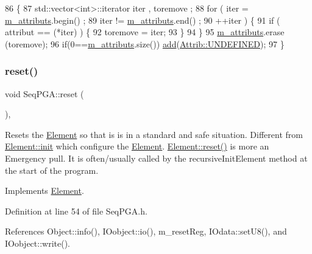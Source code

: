 \begin{DoxyCode}
86                                \{
87     std::vector<int>::iterator iter , toremove ;
88     \textcolor{keywordflow}{for} ( iter  = \hyperlink{classAttrib_ac4bd58a0cc6b38a3b711d609a3d3aacc}{m\_attributs}.begin() ;
89           iter != \hyperlink{classAttrib_ac4bd58a0cc6b38a3b711d609a3d3aacc}{m\_attributs}.end()   ;
90           ++iter ) \{
91       \textcolor{keywordflow}{if} ( attribut == (*iter) ) \{
92         toremove = iter;
93       \}
94     \}
95     \hyperlink{classAttrib_ac4bd58a0cc6b38a3b711d609a3d3aacc}{m\_attributs}.erase (toremove);
96     \textcolor{keywordflow}{if}(0==\hyperlink{classAttrib_ac4bd58a0cc6b38a3b711d609a3d3aacc}{m\_attributs}.size()) \hyperlink{classAttrib_a235f773af19c900264a190b00a3b4ad7}{add}(\hyperlink{classAttrib_a69e171d7cc6417835a5a306d3c764235a3a8da2ab97dda18aebab196fe4100531}{Attrib::UNDEFINED});
97   \}
\end{DoxyCode}
\mbox{\label{classSeqPGA_aaadcbdd7ad7c96d2d69549b820da6809}} 
\subsubsection{\texorpdfstring{reset()}{reset()}}
{\footnotesize\ttfamily void Seq\+P\+G\+A\+::reset (\begin{DoxyParamCaption}{ }\end{DoxyParamCaption})\hspace{0.3cm}{\ttfamily [inline]}, {\ttfamily [virtual]}}

Resets the \hyperlink{classElement}{Element} so that is is in a standard and safe situation. Different from \hyperlink{classElement_af42754b5cabc198869222725218d695c}{Element\+::init} which configure the \hyperlink{classElement}{Element}. \hyperlink{classElement_a69efffa22f06909d768149715565cb56}{Element\+::reset()} is more an Emergency pull. It is often/usually called by the recursive\+Init\+Element method at the start of the program. 

Implements \hyperlink{classElement_a69efffa22f06909d768149715565cb56}{Element}.



Definition at line 54 of file Seq\+P\+G\+A.\+h.



References Object\+::info(), I\+Oobject\+::io(), m\+\_\+reset\+Reg, I\+Odata\+::set\+U8(), and I\+Oobject\+::write().



